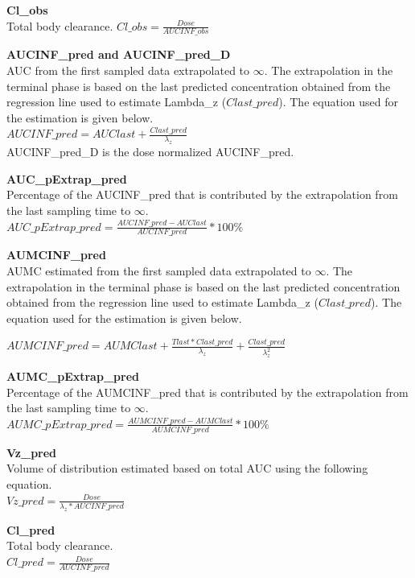 \documentclass[
  12pt,
]{krantz}
\begin{document}
\textbf{Cl\_obs}\\
Total body clearance.
\(Cl\_obs = \frac{Dose}{AUCINF\_obs}\)

\textbf{AUCINF\_pred and AUCINF\_pred\_D}\\
AUC from the first sampled data extrapolated to \({\infty}\). The extrapolation in the terminal phase is based on the last predicted concentration obtained from the regression line used to estimate Lambda\_z (\({Clast\_pred}\)). The equation used for the estimation is given below.\\
\(AUCINF\_pred = AUClast+\frac{Clast\_pred}{\lambda_z}\)\\
AUCINF\_pred\_D is the dose normalized AUCINF\_pred.

\textbf{AUC\_pExtrap\_pred}\\
Percentage of the AUCINF\_pred that is contributed by the extrapolation from the last sampling time to \({\infty}\).\\
\(AUC\_pExtrap\_pred = \frac{AUCINF\_pred-AUClast}{AUCINF\_pred}*100\%\)

\textbf{AUMCINF\_pred}\\
AUMC estimated from the first sampled data extrapolated to \({\infty}\). The extrapolation in the terminal phase is based on the last predicted concentration obtained from the regression line used to estimate Lambda\_z (\({Clast\_pred}\)). The equation used for the estimation is given below.

\(AUMCINF\_pred = AUMClast+\frac{Tlast*Clast\_pred}{\lambda_z}+\frac{Clast\_pred}{\lambda_{z}^2}\)

\textbf{AUMC\_pExtrap\_pred}\\
Percentage of the AUMCINF\_pred that is contributed by the extrapolation from the last sampling time to \({\infty}\).\\
\(AUMC\_pExtrap\_pred = \frac{AUMCINF\_pred-AUMClast}{AUMCINF\_pred}*100\%\)

\textbf{Vz\_pred}\\
Volume of distribution estimated based on total AUC using the following equation.\\
\(Vz\_pred = \frac{Dose}{\lambda_z*AUCINF\_pred}\)

\textbf{Cl\_pred}\\
Total body clearance.\\
\(Cl\_pred = \frac{Dose}{AUCINF\_pred}\)
\end{document}
